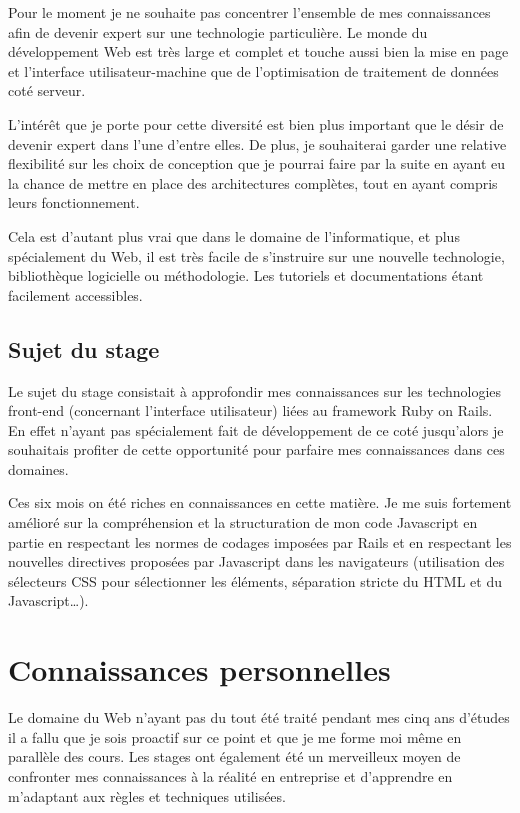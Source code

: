 \documentclass[12pt,a4paper]{book}
\begin{document}
Pour le moment je ne souhaite pas concentrer l'ensemble de mes connaissances afin de devenir expert sur une technologie particulière. Le monde du développement Web est très large et complet et touche aussi bien la mise en page et l'interface utilisateur-machine que de l'optimisation de traitement de données coté serveur.

L'intérêt que je porte pour cette diversité est bien plus important que le désir de devenir expert dans l'une d'entre elles. De plus, je souhaiterai garder une relative flexibilité sur les choix de conception que je pourrai faire par la suite en ayant eu la chance de mettre en place des architectures complètes, tout en ayant compris leurs fonctionnement.

Cela est d'autant plus vrai que dans le domaine de l'informatique, et plus spécialement du Web, il est très facile de s'instruire sur une nouvelle technologie, bibliothèque logicielle ou méthodologie. Les tutoriels et documentations étant facilement accessibles.

\subsection{Sujet du stage}

Le sujet du stage consistait à approfondir mes connaissances sur les technologies front-end (concernant l'interface utilisateur) liées au framework Ruby on Rails. En effet n'ayant pas spécialement fait de développement de ce coté jusqu'alors je souhaitais profiter de cette opportunité pour parfaire mes connaissances dans ces domaines.

Ces six mois on été riches en connaissances en cette matière. Je me suis fortement amélioré sur la compréhension et la structuration de mon code Javascript en partie en respectant les normes de codages imposées par Rails et en respectant les nouvelles directives proposées par Javascript dans les navigateurs (utilisation des sélecteurs CSS pour sélectionner les éléments, séparation stricte du HTML et du Javascript…).

\section{Connaissances personnelles}

Le domaine du Web n'ayant pas du tout été traité pendant mes cinq ans d'études il a fallu que je sois proactif sur ce point et que je me forme moi même en parallèle des cours. Les stages ont également été un merveilleux moyen de confronter mes connaissances à la réalité en entreprise et d'apprendre en m'adaptant aux règles et techniques utilisées.
\end{document}
